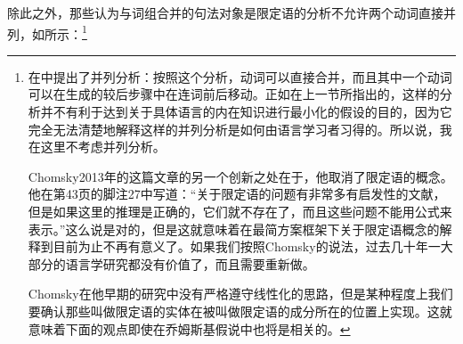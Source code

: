 除此之外，那些认为与词组合并的句法对象是限定语的分析不允许两个动词直接并列，如所示：\footnote{\label{fn-Chomsky-on-Specifiers}%
\citet[]{Chomsky2013a}在中提出了并列分析：按照这个分析，动词可以直接合并，而且其中一个动词可以在生成的较后步骤中在连词前后移动。正如在上一节所指出的，这样的分析并不有利于达到关于具体语言的内在知识进行最小化的假设的目的，因为它完全无法清楚地解释这样的并列分析是如何由语言学习者习得的。所以说，我在这里不考虑并列分析。

Chomsky2013年的这篇文章的另一个创新之处在于，他取消了限定语的概念。他在第43页的脚注27中写道：“关于限定语的问题有非常多有启发性的文献，但是如果这里的推理是正确的，它们就不存在了，而且这些问题不能用公式来表示。”这么说是对的，但是这就意味着在最简方案框架下关于限定语概念的解释到目前为止不再有意义了。如果我们按照Chomsky的说法，过去几十年一大部分的语言学研究都没有价值了，而且需要重新做。

Chomsky在他早期的研究中没有严格遵守线性化的思路，但是某种程度上我们要确认那些叫做限定语的实体在被叫做限定语的成分所在的位置上实现。这就意味着下面的观点即使在乔姆斯基假说中也将是相关的。
}
%

